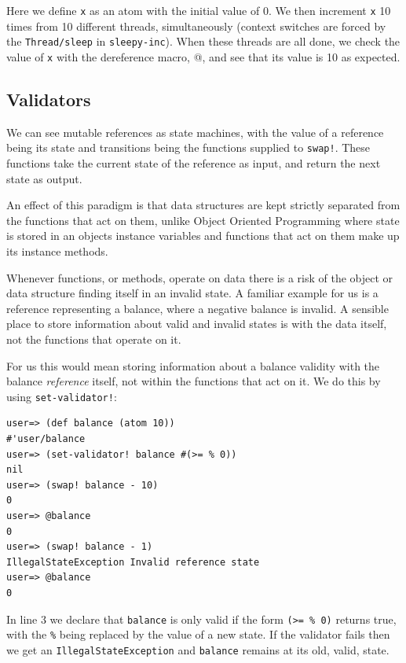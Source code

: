 \documentclass[a4paper,12pt]{kth-mag}
\begin{document}
Here we define \texttt{x} as an atom with the initial value of 0. We then increment \texttt{x} 10 times from 10 different threads, simultaneously (context switches are forced by the \texttt{Thread/sleep} in \texttt{sleepy-inc}). When these threads are all done, we check the value of \texttt{x} with the dereference macro, @, and see that its value is 10 as expected.

\subsection{Validators}

We can see mutable references as state machines, with the value of a reference being its state and transitions being the functions supplied to \texttt{swap!}. These functions take the current state of the reference as input, and return the next state as output. 

An effect of this paradigm is that data structures are kept strictly separated from the functions that act on them, unlike Object Oriented Programming where state is stored in an objects instance variables and functions that act on them make up its instance methods.

Whenever functions, or methods, operate on data there is a risk of the object or data structure finding itself in an invalid state. A familiar example for us is a reference representing a balance, where a negative balance is invalid. A sensible place to store information about valid and invalid states is with the data itself, not the functions that operate on it.

For us this would mean storing information about a balance validity with the balance \textit{reference} itself, not within the functions that act on it. We do this by using \texttt{set-validator!}:

\begin{listing}[H]
	\begin{verbatim}
user=> (def balance (atom 10))
#'user/balance
user=> (set-validator! balance #(>= % 0)) 
nil
user=> (swap! balance - 10)
0
user=> @balance
0
user=> (swap! balance - 1)
IllegalStateException Invalid reference state
user=> @balance
0
	\end{verbatim}
\end{listing}

In line 3 we declare that \texttt{balance} is only valid if the form \texttt{(>= \% 0)} returns true, with the \texttt{\%} being replaced by  the value of a new state. If the validator fails then we get an \texttt{IllegalStateException} and \texttt{balance} remains at its old, valid, state.
\end{document}
